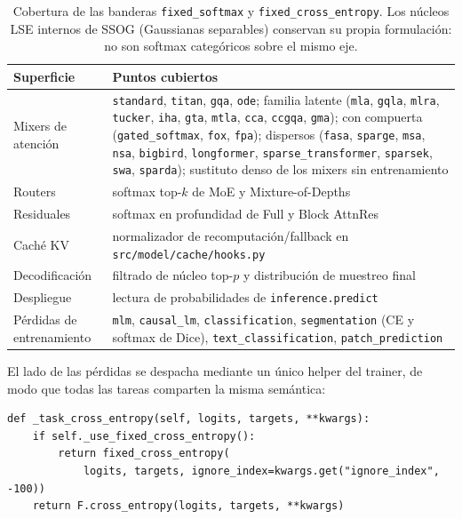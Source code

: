 \begin{table}[H]
\centering
\small
\begin{tabular}{L{4.1cm}L{8.8cm}}
\toprule
\textbf{Superficie} & \textbf{Puntos cubiertos} \\
\midrule
Mixers de atención & \texttt{standard}, \texttt{titan}, \texttt{gqa}, \texttt{ode}; familia latente (\texttt{mla}, \texttt{gqla}, \texttt{mlra}, \texttt{tucker}, \texttt{iha}, \texttt{gta}, \texttt{mtla}, \texttt{cca}, \texttt{ccgqa}, \texttt{gma}); con compuerta (\texttt{gated\_softmax}, \texttt{fox}, \texttt{fpa}); dispersos (\texttt{fasa}, \texttt{sparge}, \texttt{msa}, \texttt{nsa}, \texttt{bigbird}, \texttt{longformer}, \texttt{sparse\_transformer}, \texttt{sparsek}, \texttt{swa}, \texttt{sparda}); sustituto denso de los mixers sin entrenamiento \\
Routers & softmax top-$k$ de MoE y Mixture-of-Depths \\
Residuales & softmax en profundidad de Full y Block AttnRes \\
Caché KV & normalizador de recomputación/fallback en \texttt{src/model/cache/hooks.py} \\
Decodificación & filtrado de núcleo top-$p$ y distribución de muestreo final \\
Despliegue & lectura de probabilidades de \texttt{inference.predict} \\
Pérdidas de entrenamiento & \texttt{mlm}, \texttt{causal\_lm}, \texttt{classification}, \texttt{segmentation} (CE y softmax de Dice), \texttt{text\_classification}, \texttt{patch\_prediction} \\
\bottomrule
\end{tabular}
\caption{Cobertura de las banderas \texttt{fixed\_softmax} y \texttt{fixed\_cross\_entropy}. Los núcleos LSE internos de SSOG (Gaussianas separables) conservan su propia formulación: no son softmax categóricos sobre el mismo eje.}
\label{tab:fixed-coverage}
\end{table}

El lado de las pérdidas se despacha mediante un único helper del trainer, de modo que todas las tareas comparten la misma semántica:
\begin{verbatim}
def _task_cross_entropy(self, logits, targets, **kwargs):
    if self._use_fixed_cross_entropy():
        return fixed_cross_entropy(
            logits, targets, ignore_index=kwargs.get("ignore_index", -100))
    return F.cross_entropy(logits, targets, **kwargs)
\end{verbatim}

